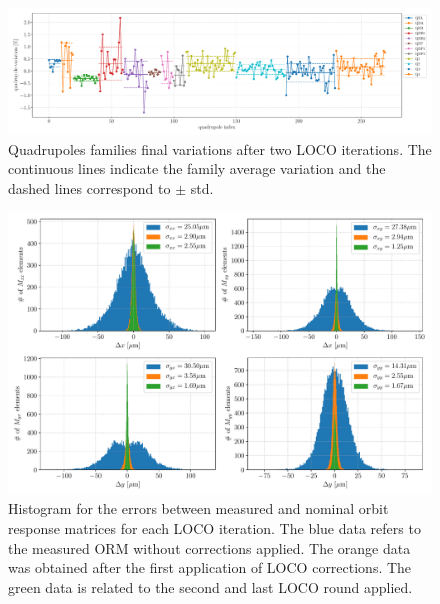 \begin{figure}
\centering
\includegraphics[width=1.0\textwidth]{figures/final_quads_correction_families.pdf}
\caption{Quadrupoles families final variations after two LOCO iterations. The continuous lines indicate the family average variation and the dashed lines correspond to $\pm$ std.}
\label{fig:loco_corrections_final_families}
\end{figure}


\begin{figure}
\centering
\includegraphics[width=1.0\textwidth]{figures/histogram_loco_iterations3_grid.pdf}
\caption{Histogram for the errors between measured and nominal orbit response matrices for each LOCO iteration. The blue data refers to the measured ORM without corrections applied. The orange data was obtained after the first application of LOCO corrections. The green data is related to the second and last LOCO round applied.}
\label{fig:histogram}
\end{figure}

